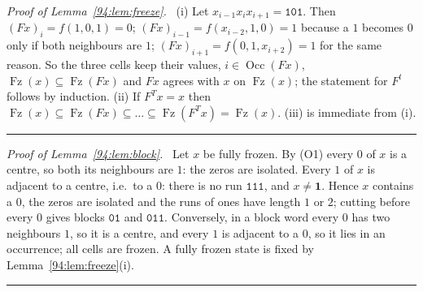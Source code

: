\documentclass[10pt,a4paper]{article}
\newcommand{\qedmark}{\rule{1.1ex}{1.1ex}}
\newenvironment{proof}[1][Proof]{\par\smallskip\noindent\textit{#1.}\ }{\hfill\qedmark\par\smallskip}
\newcommand{\one}{\mathbf{1}}                 %
\newcommand{\code}[1]{\mathtt{#1}}            %
\newcommand{\Occ}{\operatorname{Occ}}         %
\newcommand{\Fz}{\operatorname{Fz}}           %
\begin{document}
\begin{proof}[Proof of Lemma~\ref{94:lem:freeze}]
(i) Let $x_{i-1}x_ix_{i+1}=\code{101}$. Then $(Fx)_i=f(1,0,1)=0$; $(Fx)_{i-1}=f(x_{i-2},1,0)=1$ because a $1$
becomes $0$ only if both neighbours are $1$; $(Fx)_{i+1}=f(0,1,x_{i+2})=1$ for the same reason. So the three cells
keep their values, $i\in\Occ(Fx)$, $\Fz(x)\subseteq\Fz(Fx)$ and $Fx$ agrees with $x$ on $\Fz(x)$; the statement for
$F^t$ follows by induction.
(ii) If $F^Tx=x$ then $\Fz(x)\subseteq\Fz(Fx)\subseteq\dots\subseteq\Fz(F^Tx)=\Fz(x)$.
(iii) is immediate from (i).
\end{proof}

\begin{proof}[Proof of Lemma~\ref{94:lem:block}]
Let $x$ be fully frozen. By (O1) every $0$ of $x$ is a centre, so both its neighbours are $1$: the zeros are
isolated. Every $1$ of $x$ is adjacent to a centre, i.e.\ to a $0$: there is no run $\code{111}$, and $x\ne\one$.
Hence $x$ contains a $0$, the zeros are isolated and the runs of ones have length $1$ or $2$; cutting before every
$0$ gives blocks $\code{01}$ and $\code{011}$. Conversely, in a block word every $0$ has two neighbours $1$, so it
is a centre, and every $1$ is adjacent to a $0$, so it lies in an occurrence; all cells are frozen. A fully frozen
state is fixed by Lemma~\ref{94:lem:freeze}(i).
\end{proof}
\end{document}
